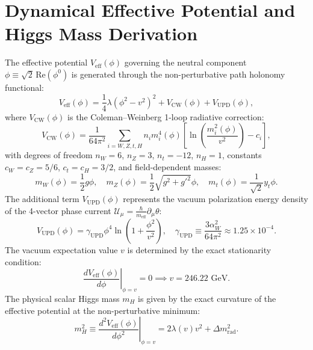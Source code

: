 \documentclass[11pt,a4paper]{article}
\begin{document}
\section{Dynamical Effective Potential and Higgs Mass Derivation}
The effective potential $V_{\mathrm{eff}}(\phi)$ governing the neutral component $\phi \equiv \sqrt{2}\,\mathrm{Re}(\phi^0)$ is generated through the non-perturbative path holonomy functional:
\begin{equation}
V_{\mathrm{eff}}(\phi) = \frac{1}{4} \lambda (\phi^2 - v^2)^2 + V_{\mathrm{CW}}(\phi) + V_{\mathrm{UPD}}(\phi),
\label{eq:V_eff_total}
\end{equation}
where $V_{\mathrm{CW}}(\phi)$ is the Coleman--Weinberg 1-loop radiative correction:
\begin{equation}
V_{\mathrm{CW}}(\phi) = \frac{1}{64\pi^2} \sum_{i = W, Z, t, H} n_i m_i^4(\phi) \left[ \ln \left( \frac{m_i^2(\phi)}{v^2} \right) - c_i \right],
\label{eq:V_CW}
\end{equation}
with degrees of freedom $n_W = 6$, $n_Z = 3$, $n_t = -12$, $n_H = 1$, constants $c_W = c_Z = 5/6$, $c_t = c_H = 3/2$, and field-dependent masses:
\begin{equation}
m_W(\phi) = \frac{1}{2} g \phi, \quad m_Z(\phi) = \frac{1}{2}\sqrt{g^2 + g'^2}\phi, \quad m_t(\phi) = \frac{1}{\sqrt{2}} y_t \phi.
\label{eq:masses_phi}
\end{equation}
The additional term $V_{\mathrm{UPD}}(\phi)$ represents the vacuum polarization energy density of the 4-vector phase current $\mathcal{U}_\mu = \frac{\hbar}{m_{\mathrm{eff}}}\partial_\mu \theta$:
\begin{equation}
V_{\mathrm{UPD}}(\phi) = \gamma_{\mathrm{UPD}} \phi^4 \ln \left( 1 + \frac{\phi^2}{v^2} \right), \quad \gamma_{\mathrm{UPD}} \equiv \frac{3 \alpha_W^2}{64\pi^2} \approx 1.25 \times 10^{-4}.
\label{eq:V_UPD}
\end{equation}
The vacuum expectation value $v$ is determined by the exact stationarity condition:
\begin{equation}
\left. \frac{d V_{\mathrm{eff}}(\phi)}{d\phi} \right|_{\phi = v} = 0 \implies v = 246.22\text{ GeV}.
\label{eq:vev_condition}
\end{equation}
The physical scalar Higgs mass $m_H$ is given by the exact curvature of the effective potential at the non-perturbative minimum:
\begin{equation}
m_H^2 \equiv \left. \frac{d^2 V_{\mathrm{eff}}(\phi)}{d\phi^2} \right|_{\phi = v} = 2 \lambda(v) v^2 + \Delta m_{\mathrm{rad}}^2.
\label{eq:Higgs_mass_formula}
\end{equation}
\end{document}
